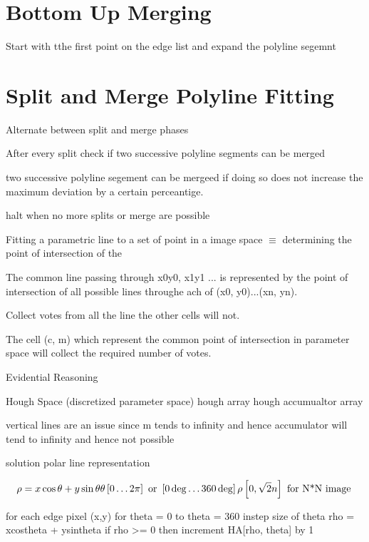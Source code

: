 \documentclass[11pt]{article}
\theoremstyle{definition}
\begin{document}
\section{Bottom Up Merging}

Start with tthe first point on the edge list and expand the polyline segemnt 


\section{Split and Merge Polyline Fitting}

Alternate between split and merge phases

After every split check if two successive polyline segments can be merged

two successive polyline segement can be mergeed if doing so does not increase the maximum deviation by a certain perceantige.

halt when no more splits or merge are possible 


Fitting a parametric line to a set of point in a image space $\equiv$ determining the point of intersection of the 


\newpage
\pagestyle{plain}  %

The common line passing through x0y0, x1y1 ... is represented by the point of intersection of all possible lines throughe ach of (x0, y0)...(xn, yn).

Collect votes from all the line the other cells will not.

The cell (c, m) which represent the common point of intersection in parameter space will collect the required number of votes.

Evidential Reasoning

Hough Space (discretized parameter space) hough array hough accumualtor array



vertical lines are an issue since m tends to infinity and hence accumulator will tend to infinity and hence not possible

solution polar line representation


\[
\rho = x\cos\theta + y\sin\theta \\
\theta \left[0\dots2\pi\right] \text{ or } \left[0\deg\dots360\deg\right] \\
\rho \left[0, \sqrt{2}n\right]  \text{ for N*N image }
\]

for each edge pixel (x,y)
{for theta = 0 to theta = 360 instep size of theta
    {rho = xcostheta + ysintheta 
    if rho >= 0 then increment HA[rho, theta] by 1
}}
\end{document}
